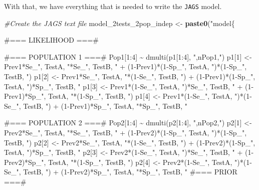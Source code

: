 \documentclass[
]{book}
\newenvironment{Shaded}{\begin{snugshade}}{\end{snugshade}}
\newcommand{\CommentTok}[1]{\textcolor[rgb]{0.56,0.35,0.01}{\textit{#1}}}
\newcommand{\FunctionTok}[1]{\textcolor[rgb]{0.13,0.29,0.53}{\textbf{#1}}}
\newcommand{\NormalTok}[1]{#1}
\newcommand{\OtherTok}[1]{\textcolor[rgb]{0.56,0.35,0.01}{#1}}
\newcommand{\StringTok}[1]{\textcolor[rgb]{0.31,0.60,0.02}{#1}}
\begin{document}
With that, we have everything that is needed to write the \texttt{JAGS} model.

\begin{Shaded}
\begin{Highlighting}[]
\CommentTok{\#Create the JAGS text file}
\NormalTok{model\_2tests\_2pop\_indep }\OtherTok{\textless{}{-}} \FunctionTok{paste0}\NormalTok{(}\StringTok{"model\{}

\StringTok{\#=== LIKELIHOOD ===\#}

\StringTok{  \#=== POPULATION 1 ===\#}
\StringTok{  Pop1[1:4] \textasciitilde{} dmulti(p1[1:4], "}\NormalTok{,nPop1,}\StringTok{")}
\StringTok{  p1[1] \textless{}{-} Prev1*Se\_"}\NormalTok{, TestA, }\StringTok{"*Se\_"}\NormalTok{, TestB, }\StringTok{" + (1{-}Prev1)*(1{-}Sp\_"}\NormalTok{, TestA, }\StringTok{")*(1{-}Sp\_"}\NormalTok{, TestB, }\StringTok{")}
\StringTok{  p1[2] \textless{}{-} Prev1*Se\_"}\NormalTok{, TestA, }\StringTok{"*(1{-}Se\_"}\NormalTok{, TestB, }\StringTok{") + (1{-}Prev1)*(1{-}Sp\_"}\NormalTok{, TestA, }\StringTok{")*Sp\_"}\NormalTok{, TestB, }\StringTok{"}
\StringTok{  p1[3] \textless{}{-} Prev1*(1{-}Se\_"}\NormalTok{, TestA, }\StringTok{")*Se\_"}\NormalTok{, TestB, }\StringTok{" + (1{-}Prev1)*Sp\_"}\NormalTok{, TestA, }\StringTok{"*(1{-}Sp\_"}\NormalTok{, TestB, }\StringTok{")}
\StringTok{  p1[4] \textless{}{-} Prev1*(1{-}Se\_"}\NormalTok{, TestA, }\StringTok{")*(1{-}Se\_"}\NormalTok{, TestB, }\StringTok{") + (1{-}Prev1)*Sp\_"}\NormalTok{, TestA, }\StringTok{"*Sp\_"}\NormalTok{, TestB, }\StringTok{"}

\StringTok{  \#=== POPULATION 2 ===\#  }
\StringTok{  Pop2[1:4] \textasciitilde{} dmulti(p2[1:4], "}\NormalTok{,nPop2,}\StringTok{")}
\StringTok{  p2[1] \textless{}{-} Prev2*Se\_"}\NormalTok{, TestA, }\StringTok{"*Se\_"}\NormalTok{, TestB, }\StringTok{" + (1{-}Prev2)*(1{-}Sp\_"}\NormalTok{, TestA, }\StringTok{")*(1{-}Sp\_"}\NormalTok{, TestB, }\StringTok{")}
\StringTok{  p2[2] \textless{}{-} Prev2*Se\_"}\NormalTok{, TestA, }\StringTok{"*(1{-}Se\_"}\NormalTok{, TestB, }\StringTok{") + (1{-}Prev2)*(1{-}Sp\_"}\NormalTok{, TestA, }\StringTok{")*Sp\_"}\NormalTok{, TestB, }\StringTok{"}
\StringTok{  p2[3] \textless{}{-} Prev2*(1{-}Se\_"}\NormalTok{, TestA, }\StringTok{")*Se\_"}\NormalTok{, TestB, }\StringTok{" + (1{-}Prev2)*Sp\_"}\NormalTok{, TestA, }\StringTok{"*(1{-}Sp\_"}\NormalTok{, TestB, }\StringTok{")}
\StringTok{  p2[4] \textless{}{-} Prev2*(1{-}Se\_"}\NormalTok{, TestA, }\StringTok{")*(1{-}Se\_"}\NormalTok{, TestB, }\StringTok{") + (1{-}Prev2)*Sp\_"}\NormalTok{, TestA, }\StringTok{"*Sp\_"}\NormalTok{, TestB, }\StringTok{"}
\StringTok{  }
\StringTok{  }
\StringTok{\#=== PRIOR  ===\#}


\end{Highlighting}
\end{Shaded}
\end{document}

